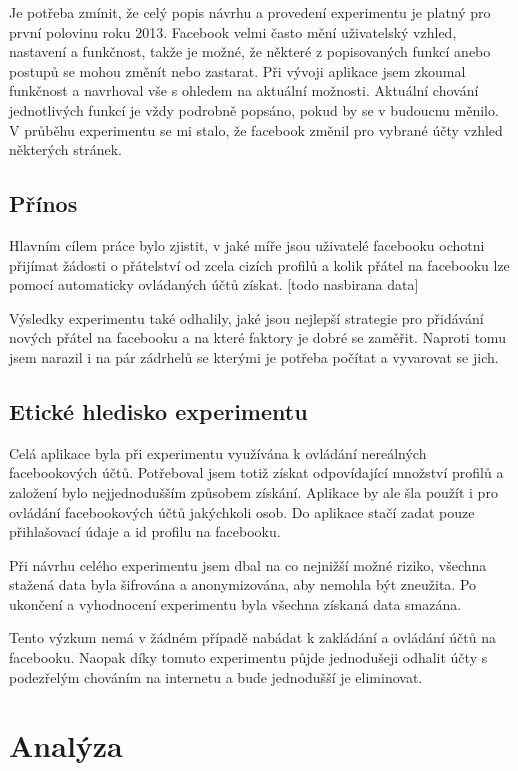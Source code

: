 \documentclass[thesis=M,czech]{FITthesis}[2013/05/10]
\begin{document}
Je potřeba zmínit, že celý popis návrhu a provedení experimentu je platný pro první polovinu roku 2013. Facebook velmi často mění uživatelský vzhled, nastavení a funkčnost, takže je možné, že některé z popisovaných funkcí anebo postupů se mohou změnít nebo zastarat. Při vývoji aplikace jsem zkoumal funkčnost a navrhoval vše s ohledem na aktuální možnosti. Aktuální chování jednotlivých funkcí je vždy podrobně popsáno, pokud by se v budoucnu měnilo. V průběhu experimentu se mi stalo, že facebook změnil pro vybrané účty vzhled některých stránek. 

\section{Přínos}

Hlavním cílem práce bylo zjistit, v jaké míře jsou uživatelé facebooku ochotni přijímat žádosti o přátelství od zcela cizích profilů a kolik přátel na facebooku lze pomocí automaticky ovládaných účtů získat. [todo nasbirana data]

Výsledky experimentu také odhalily, jaké jsou nejlepší strategie pro přidávání nových přátel na facebooku a na které faktory je dobré se zaměřit. Naproti tomu jsem narazil i na pár zádrhelů se kterými je potřeba počítat a vyvarovat se jich.

\section{Etické hledisko experimentu}

Celá aplikace byla při experimentu využívána k ovládání nereálných facebookových účtů. Potřeboval jsem totiž získat odpovídající množství profilů a založení bylo nejjednodušším způsobem získání. Aplikace by ale šla použít i pro ovládání facebookových účtů jakýchkoli osob. Do aplikace stačí zadat pouze přihlašovací údaje a id profilu na facebooku.

Při návrhu celého experimentu jsem dbal na co nejnižší možné riziko, všechna stažená data byla šifrována a anonymizována, aby nemohla být zneužita. Po ukončení a vyhodnocení experimentu byla všechna získaná data smazána. 

Tento výzkum nemá v žádném případě nabádat k zakládání a ovládání účtů na facebooku. Naopak díky tomuto experimentu půjde jednodušeji odhalit účty s podezřelým chováním na internetu a bude jednodušší je eliminovat.






\chapter{Analýza}
\end{document}
